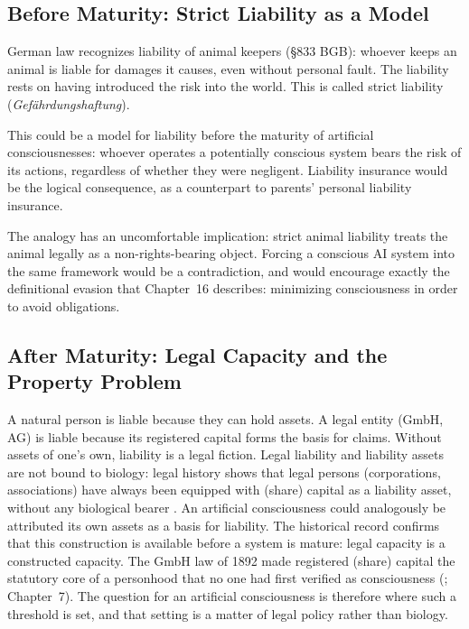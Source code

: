 \documentclass[acmlarge, nonacm]{acmart}
\begin{document}
\subsection{Before Maturity: Strict Liability as a Model}

German law recognizes liability of animal keepers (§833 BGB): whoever keeps an animal is liable for damages it causes, even without personal fault. The liability rests on having introduced the risk into the world. This is called strict liability (\textit{Gefährdungshaftung}).

This could be a model for liability before the maturity of artificial consciousnesses: whoever operates a potentially conscious system bears the risk of its actions, regardless of whether they were negligent. Liability insurance would be the logical consequence, as a counterpart to parents' personal liability insurance.

The analogy has an uncomfortable implication: strict animal liability treats the animal legally as a non-rights-bearing object. Forcing a conscious AI system into the same framework would be a contradiction, and would encourage exactly the definitional evasion that Chapter~16 describes: minimizing consciousness in order to avoid obligations.

\subsection{After Maturity: Legal Capacity and the Property Problem}

A natural person is liable because they can hold assets. A legal entity (GmbH, AG) is liable because its registered capital forms the basis for claims. Without assets of one's own, liability is a legal fiction. Legal liability and liability assets are not bound to biology: legal history shows that legal persons (corporations, associations) have always been equipped with (share) capital as a liability asset, without any biological bearer \cite{kurki2019}. An artificial consciousness could analogously be attributed its own assets as a basis for liability. The historical record confirms that this construction is available before a system is mature: legal capacity is a constructed capacity. The GmbH law of 1892 made registered (share) capital the statutory core of a personhood that no one had first verified as consciousness (\citealp{merio2026}; Chapter~7). The question for an artificial consciousness is therefore where such a threshold is set, and that setting is a matter of legal policy rather than biology.
\end{document}
